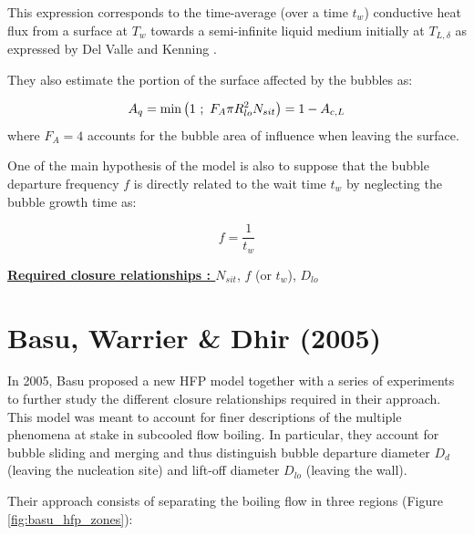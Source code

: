 This expression corresponds to the time-average (over a time $t_{w}$) conductive heat flux from a surface at $T_{w}$ towards a semi-infinite liquid medium initially at $T_{L,\delta}$ as expressed by Del Valle and Kenning \cite{del_valle_subcooled_1985}.

\npar
They also estimate the portion of the surface affected by the bubbles as:

\begin{align}
A_{q}=\mathrm{min}\left( 1\ ;\ F_{A}\pi R_{lo}^{2} N_{sit} \right)=1-A_{c,L}
\label{eq:KP_hfp_Aq}
\end{align}
where $F_{A}=4$ accounts for the bubble area of influence when leaving the surface.

\npar

One of the main hypothesis of the model is also to suppose that the bubble departure frequency $f$ is directly related to the wait time $t_{w}$ by neglecting the bubble growth time as:

\begin{equation}
f = \frac{1}{t_{w}}
\end{equation}

\textbf{\underline{Required closure relationships : }} $N_{sit}$, $f$ (or $t_{w}$), $D_{lo}$ 


\section{Basu, Warrier \& Dhir (2005)}
\label{sec:hfp_basu}

In 2005, Basu \etal \cite{basu_wall_2005, basu_wall_2005-1} proposed a new HFP model together with a series of experiments to further study the different closure relationships required in their approach. This model was meant to account for finer descriptions of the multiple phenomena at stake in subcooled flow boiling. In particular, they account for bubble sliding and merging and thus distinguish bubble departure diameter $D_{d}$ (leaving the nucleation site) and lift-off diameter $D_{lo}$ (leaving the wall).

\npar
Their approach consists of separating the boiling flow in three regions (Figure \ref{fig:basu_hfp_zones}):

